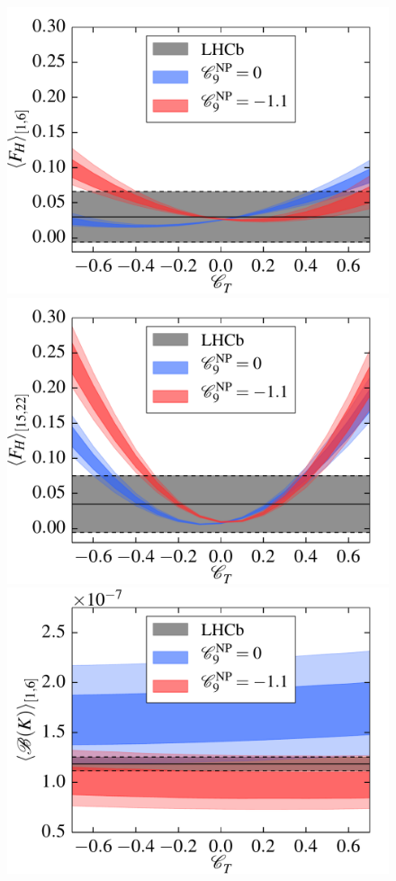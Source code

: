 \documentclass[twocolumn,epjc3]{svjour3}
\numberwithin{equation}{section}
\renewcommand{\[}{\big[}
\renewcommand{\]}{\big]}
\renewcommand{\(}{\big(}
\renewcommand{\)}{\big)}
\newlength{\relwidth}
\begin{document}
\begin{figure}
  \setlength{\relwidth}{0.33\textwidth}
  \begin{center}
    \includegraphics[width=\relwidth]{plots/pdf/ct_K_FH1to6}
    \includegraphics[width=\relwidth]{plots/pdf/ct_K_FH15to22}
    \\
    \includegraphics[width=\relwidth]{plots/pdf/ct_K_BR1to6}

\end{center}
\end{figure}
\end{document}
